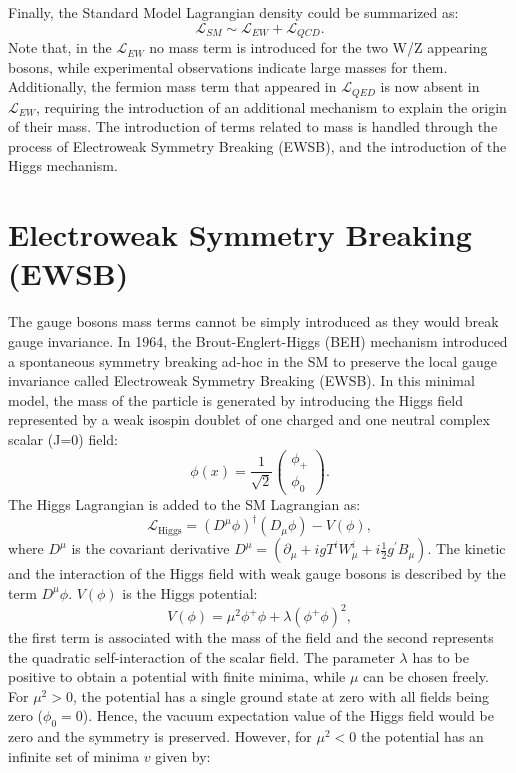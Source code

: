 Finally, the Standard Model Lagrangian density could be summarized as: 
\begin{equation}
    \mathcal{L}_{SM} \sim \mathcal{L}_{EW} + \mathcal{L}_{QCD}.
\end{equation}
Note that, in the $\mathcal{L}_{EW}$ no mass term is introduced for the two W/Z appearing bosons, while experimental observations indicate large masses for them. Additionally, the fermion mass term that appeared in $\mathcal{L}_{QED}$ is now absent in $\mathcal{L}_{EW}$, requiring the introduction of an additional mechanism to explain the origin of their mass. The introduction of terms related to mass is handled through the process of Electroweak Symmetry Breaking (EWSB), and the introduction of the Higgs mechanism.

\section{Electroweak Symmetry Breaking (EWSB)}
\label{chap1:EWSB}
The gauge bosons mass terms cannot be simply introduced as they would break gauge invariance. In 1964, the Brout-Englert-Higgs (BEH) mechanism introduced a spontaneous symmetry breaking ad-hoc in the SM to preserve the local gauge invariance \cite{Englert} called Electroweak Symmetry Breaking (EWSB). In this minimal model, the mass of the particle is generated by introducing the Higgs field represented by a weak isospin doublet of one charged and one neutral complex scalar (J=0) field:
\begin{equation}
    \phi(x)=\frac{1}{\sqrt{2}}\left(\begin{array}{c}
\phi_{+} \\
\phi_{0}
\end{array}\right).
\end{equation}
The Higgs Lagrangian is added to the SM Lagrangian as:
\begin{equation}
    \mathcal{L}_{\mathrm{Higgs}}=\left(D^{\mu} \phi\right)^{\dagger}\left(D_{\mu} \phi\right)-V(\phi),
\end{equation}
where $D^\mu$ is the covariant derivative $D^\mu =\left(\partial_{\mu}+i g T^{i} W_{\mu}^{i}+i \frac{1}{2} g^{\prime} B_{\mu}\right)$. The kinetic and the interaction of the Higgs field with weak gauge bosons is described by the term $D^\mu\phi$. $V(\phi)$ is the Higgs potential:
\begin{equation}
    V(\phi)=\mu^{2} \phi^{+} \phi+\lambda\left(\phi^{+} \phi\right)^{2},
\end{equation}
the first term is associated with the mass of the field and the second represents the quadratic self-interaction of the scalar field. The parameter $\lambda$ has to be positive to obtain a potential with finite minima, while $\mu$ can be chosen freely. For $\mu^{2} > 0$, the potential has a single ground state at zero with all fields being zero ($\phi_0 = 0$). Hence, the vacuum expectation value of the Higgs field would be zero and the symmetry is preserved. However, for $\mu^{2} < 0$ the potential has an infinite set of minima $v$ given by:
